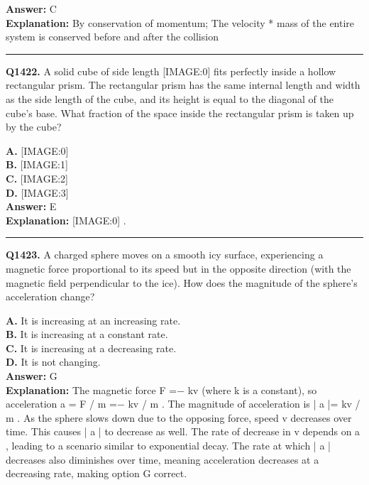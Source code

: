 \documentclass[12pt]{article}
\begin{document}
\textbf{Answer:} C \\
\textbf{Explanation:} By conservation of momentum; The velocity * mass of the entire system is conserved before and after the collision

\hrule
\vspace{1em}


\noindent
\textbf{Q1422.} A solid cube of side length
[IMAGE:0]
fits perfectly inside a hollow rectangular prism. The rectangular prism has the same internal length and width as the side length of the cube, and its height is equal to the diagonal of the cube's base. What fraction of the space inside the rectangular prism is taken up by the cube?



\textbf{A.} [IMAGE:0] \\
\textbf{B.} [IMAGE:1] \\
\textbf{C.} [IMAGE:2] \\
\textbf{D.} [IMAGE:3] \\

\textbf{Answer:} E \\
\textbf{Explanation:} [IMAGE:0]
.

\hrule
\vspace{1em}


\noindent
\textbf{Q1423.} A charged sphere moves on a smooth icy surface, experiencing a magnetic force proportional to its speed but in the opposite direction (with the magnetic field perpendicular to the ice). How does the magnitude of the sphere’s acceleration change?



\textbf{A.} It is increasing at an increasing rate. \\
\textbf{B.} It is increasing at a constant rate. \\
\textbf{C.} It is increasing at a decreasing rate. \\
\textbf{D.} It is not changing. \\

\textbf{Answer:} G \\
\textbf{Explanation:} The magnetic force
F
=−
kv
(where
k
is a constant), so acceleration
a
=
F
/
m
=−
kv
/
m
. The magnitude of acceleration is |
a
|=
kv
/
m
. As the sphere slows down due to the opposing force, speed
v
decreases over time. This causes |
a
| to decrease as well. The rate of decrease in
v
depends on
a
, leading to a scenario similar to exponential decay. The rate at which |
a
| decreases also diminishes over time, meaning acceleration decreases at a decreasing rate, making option G correct.
\end{document}
